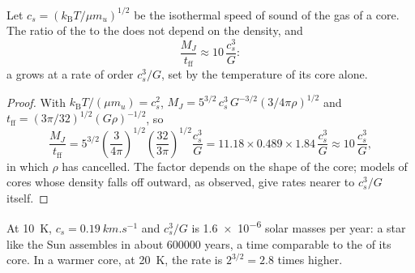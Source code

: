 \begin{proposition}
\label{prop:b2:ism-star-formation:accretion}
Let $c_s = (k_{\mathrm B}T/\mu m_u)^{1/2}$ be the isothermal speed of sound
of the gas of a core. The ratio of the  to the  does
not depend on the density, and
\[
  \frac{M_J}{t_{\mathrm{ff}}} \approx 10\,\frac{c_s^3}{G}:
\]
a  grows at a rate of order $c_s^3/G$, set by the temperature of its
core alone.
\end{proposition}

\begin{proof}
With $k_{\mathrm B}T/(\mu m_u) = c_s^2$, $M_J = 5^{3/2}\,c_s^3\,G^{-3/2}
(3/4\pi\rho)^{1/2}$ and $t_{\mathrm{ff}} = (3\pi/32)^{1/2}(G\rho)^{-1/2}$, so
\[
  \frac{M_J}{t_{\mathrm{ff}}} = 5^{3/2}\left(\frac{3}{4\pi}\right)^{1/2}
  \left(\frac{32}{3\pi}\right)^{1/2}\frac{c_s^3}{G}
  = 11.18\times0.489\times1.84\,\frac{c_s^3}{G} \approx 10\,\frac{c_s^3}{G},
\]
in which $\rho$ has cancelled. The factor depends on the shape of the core;
models of cores whose density falls off outward, as observed, give rates
nearer to $c_s^3/G$ itself.
\end{proof}

At \qty{10}{K}, $c_s = \qty{0.19}{km.s^{-1}}$ and $c_s^3/G$ is
\num{1.6e-6} solar masses per year: a star like the Sun assembles in about
\num{600000} years, a time comparable to the  of its core.
In a warmer core, at \qty{20}{K}, the rate is $2^{3/2} = 2.8$ times higher.

